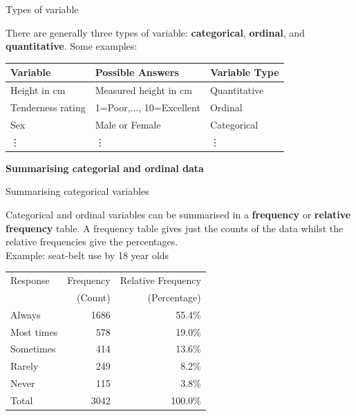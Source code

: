 \documentclass[12pt,xcolor=dvipsnames,handout,mathserif,aspectratio=169]{beamer}
\newcommand{\bbl}[1]{{\color{NavyBlue} \textbf{#1}}}
\newcommand{\bre}[1]{{\color{red} \textbf{#1}}}
\newcommand{\bgr}[1]{{\color{PineGreen} \textbf{#1}}}
\begin{document}
\begin{frame}{ Types of variable }

There are generally three types of variable: \bbl{categorical}, \bgr{ordinal}, and \bre{quantitative}. Some examples:
\small
\begin{center}
\begin{tabular}{p{4cm}|p{4.5cm}|l}
\hline
\hline
Variable & Possible Answers & Variable Type \\
\hline
\hline
Height in cm & Measured height in cm & Quantitative \\
\hline
Tenderness rating & 1=Poor,..., 10=Excellent & Ordinal \\
\hline
Sex & Male or Female & Categorical \\
\hline
\vdots & \vdots & \vdots \\
\hline
\hline
\end{tabular}
\end{center}
\end{frame}

\begin{frame}[fragile]{}
\bbl{\Huge Summarising categorial and ordinal data}\\ 
\vspace{0.5cm}
\end{frame}

\begin{frame}{ Summarising categorical variables }

Categorical and ordinal variables can be summarised in a \bbl{frequency} or \bbl{relative frequency} table. A frequency table gives just the counts of the data whilst the relative frequencies give the percentages.\\
\pause
\vspace{0.2cm}
Example: seat-belt use by 18 year olds
\begin{center}
\begin{tabular}{lrr}
\hline
\hline
Response & \centering Frequency & Relative Frequency \\
 & (Count) & (Percentage) \\
\hline
Always & 1686 & 55.4\% \\
Most times & 578 & 19.0\% \\
Sometimes & 414 & 13.6\% \\
Rarely & 249 & 8.2\% \\
Never & 115 & 3.8\% \\
\hline
Total & 3042 & 100.0\% \\
\hline
\hline
\end{tabular}
\end{center}
\end{frame}
\end{document}
